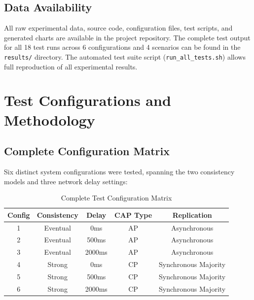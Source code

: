 \documentclass[10pt,a4paper]{article}
\begin{document}
\subsection{Data Availability}

All raw experimental data, source code, configuration files, test scripts, and generated charts are available in the project repository. The complete test output for all 18 test runs across 6 configurations and 4 scenarios can be found in the \texttt{results/} directory. The automated test suite script (\texttt{run\_all\_tests.sh}) allows full reproduction of all experimental results.

\newpage

\section{Test Configurations and Methodology}

\subsection{Complete Configuration Matrix}

Six distinct system configurations were tested, spanning the two consistency models and three network delay settings:

\begin{table}[H]
\centering
\caption{Complete Test Configuration Matrix}
\begin{tabular}{|c|c|c|c|c|}
\hline
\textbf{Config} & \textbf{Consistency} & \textbf{Delay} & \textbf{CAP Type} & \textbf{Replication} \\
\hline
1 & Eventual & 0ms & AP & Asynchronous \\
2 & Eventual & 500ms & AP & Asynchronous \\
3 & Eventual & 2000ms & AP & Asynchronous \\
4 & Strong & 0ms & CP & Synchronous Majority \\
5 & Strong & 500ms & CP & Synchronous Majority \\
6 & Strong & 2000ms & CP & Synchronous Majority \\
\hline
\end{tabular}
\end{table}
\end{document}
